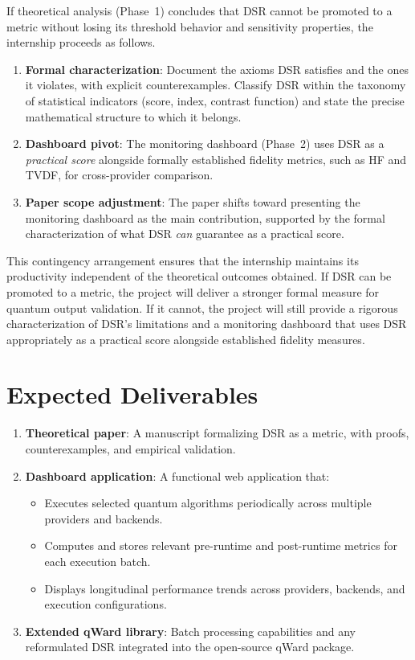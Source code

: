 \documentclass[11pt]{article}
\begin{document}
If theoretical analysis (Phase~1) concludes that DSR cannot be promoted to a metric without losing its threshold behavior and sensitivity properties, the internship proceeds as follows.

\begin{enumerate}
  \item \textbf{Formal characterization}: Document the axioms DSR satisfies and the ones it violates, with explicit counterexamples. Classify DSR within the taxonomy of statistical indicators (score, index, contrast function) and state the precise mathematical structure to which it belongs.
  \item \textbf{Dashboard pivot}: The monitoring dashboard (Phase~2) uses DSR as a \emph{practical score} alongside formally established fidelity metrics, such as HF and TVDF, for cross-provider comparison.
  \item \textbf{Paper scope adjustment}: The paper shifts toward presenting the monitoring dashboard as the main contribution, supported by the formal characterization of what DSR \emph{can} guarantee as a practical score.
\end{enumerate}

This contingency arrangement ensures that the internship maintains its productivity independent of the theoretical outcomes obtained. If DSR can be promoted to a metric, the project will deliver a stronger formal measure for quantum output validation. If it cannot, the project will still provide a rigorous characterization of DSR's limitations and a monitoring dashboard that uses DSR appropriately as a practical score alongside established fidelity measures.


\section{Expected Deliverables}

\begin{enumerate}
  \item \textbf{Theoretical paper}: A manuscript formalizing DSR as a metric, with proofs, counterexamples, and empirical validation.
  \item \textbf{Dashboard application}: A functional web application that:
  \begin{itemize}
    \item Executes selected quantum algorithms periodically across multiple providers and backends.
    \item Computes and stores relevant pre-runtime and post-runtime metrics for each execution batch.
    \item Displays longitudinal performance trends across providers, backends, and execution configurations.
  \end{itemize}
  \item \textbf{Extended qWard library}: Batch processing capabilities and any reformulated DSR integrated into the open-source qWard package.
\end{enumerate}
\end{document}
